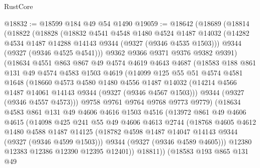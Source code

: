 \begin{lexlean}{RustCore}
\begin{coremodule}
@18832 := @18599 @184 @49 @54 @1490
@19059 := @18642
    (@18689
      (@18814
        (@18822
          (@18828
            (@18832
              @4541
              @4548
              @1480
              @4524
              @1487
              @14032
              (@14282 @4534 @1487 @14288 @14143 @9344 (@9327 (@9346 @4535 @1503)))
              @9344
              (@9327 (@9346 @4525 @4541)))
            @9362
            @9366
            @9371
            @9376
            @9382
            @9391)
          (@18634
            @4551
            @863
            @867
            @49
            @4574
            @4619
            @4643
            @4687
            (@18583
              @188
              @861
              @131
              @49
              @4574
              @4583
              @1503
              @4619
              (@14099
                @125
                @55
                @51
                @4574
                @4581
                @1648
                (@18660
                  @4573
                  @4580
                  @1480
                  @4556
                  @1487
                  @14032
                  (@14214 @4566 @1487 @14061 @14143 @9344 (@9327 (@9346 @4567 @1503)))
                  @9344
                  (@9327 (@9346 @4557 @4573)))
                @9758
                @9761
                @9764
                @9768
                @9773
                @9779)
              (@18634
                @4583
                @861
                @131
                @49
                @4606
                @4616
                @1503
                @4516
                (@13972
                  @861
                  @49
                  @4606
                  @4615
                  (@14098
                    @425
                    @241
                    @55
                    @49
                    @4606
                    @4613
                    @2744
                    (@18768
                      @4605
                      @4612
                      @1480
                      @4588
                      @1487
                      @14125
                      (@18782 @4598 @1487 @14047 @14143 @9344 (@9327 (@9346 @4599 @1503)))
                      @9344
                      (@9327 (@9346 @4589 @4605)))
                    @12380
                    @12383
                    @12386
                    @12390
                    @12395
                    @12401))
                @18811))
            (@18583
              @193
              @865
              @131
              @49

\end{coremodule}
\end{lexlean}
